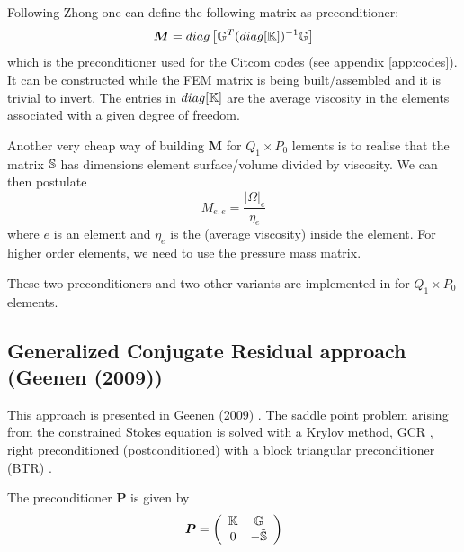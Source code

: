 Following Zhong \etal \cite{zhym12} one can define the following matrix as preconditioner:
\[
{\bm M} = diag \left[ {\mathbb{G}}^T (diag [{\mathbb{K}}]  )^{-1} {\mathbb{G}} \right]
\]
which is the preconditioner used for the Citcom codes (see appendix \ref{app:codes}). It 
can be constructed while the FEM matrix is being built/assembled
and it is trivial to invert. The entries in
$diag[{\mathbb{K}}]$ are the average viscosity in the elements associated
with a given degree of freedom.

Another very cheap way of building ${\bm M}$ for $Q_1\times P_0$ lements 
is to realise that the matrix ${\mathbb{S}}$ has dimensions element surface/volume 
divided by viscosity. We can then postulate 
\[
M_{e,e} = \frac{|\Omega|_e}{\eta_e} 
\]
where $e$ is an element and $\eta_e$ is the (average viscosity) inside the element.
For higher order elements, we need to use the pressure mass matrix.

These two preconditioners and two other variants are implemented in  for 
$Q_1\times P_0$ elements.

\subsection{Generalized Conjugate Residual approach (Geenen \etal (2009))}

This approach is presented in Geenen \etal (2009) \cite{geum09}. 
The saddle point problem arising from the constrained Stokes equation is 
solved with a Krylov method, GCR \cite{vavu94}, right preconditioned (postconditioned) 
with a block triangular preconditioner (BTR) \cite{brpa88}.

The preconditioner ${\bm P}$ is given by
\[
{\bm P} = \left(
\begin{array}{cc}
{\mathbb{K}} & {\mathbb{G}} \\
0 & - \tilde{{\mathbb{S}}}
\end{array}
\right)
\]

